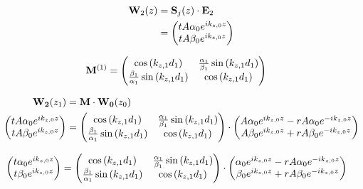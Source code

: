 \begin{align*}
	\vb{W}_2\pqty{z} &= \vb{S}_j\pqty{z} \cdot \vb{E}_2 \\
	&= \pmqty{
		tA \alpha_0 e^{i k_{z,0}z}  \\
		tA \beta_0 e^{i k_{z,0}z} }
\end{align*}

\begin{align*}
	\vb{M}^{(1)} 
		&= \pmqty{
		\cos\pqty{k_{z,1}d_1} &
		\frac{\alpha_1}{\beta_1} \sin\pqty{k_{z,1}d_1} \\
		\frac{\beta_1}{\alpha_1} \sin\pqty{k_{z,1}d_1} &
		\cos\pqty{k_{z,1}d_1}
		}
\end{align*}

\begin{align*}
	\vb{W_2}\pqty{z_1} &= \vb{M}\cdot\vb{W_0}\pqty{z_0} \\
	\pmqty{
		tA \alpha_0 e^{i k_{z,0}z}  \\
		tA \beta_0 e^{i k_{z,0}z} } &=
	\pmqty{
		\cos\pqty{k_{z,1}d_1} &
		\frac{\alpha_1}{\beta_1} \sin\pqty{k_{z,1}d_1} \\
		\frac{\beta_1}{\alpha_1} \sin\pqty{k_{z,1}d_1} &
		\cos\pqty{k_{z,1}d_1}
		} \cdot
	\pmqty{
		A \alpha_0 e^{i k_{z,0}z} - rA\alpha_0 e^{-i k_{z,0}z} \\
		A \beta_0 e^{i k_{z,0}z} + rA\beta_0 e^{-i k_{z,0}z}}
\end{align*}

\begin{align*}
	\pmqty{
		t \alpha_0 e^{i k_{z,0}z}  \\
		t \beta_0 e^{i k_{z,0}z} } &=
	\pmqty{
		\cos\pqty{k_{z,1}d_1} &
		\frac{\alpha_1}{\beta_1} \sin\pqty{k_{z,1}d_1} \\
		\frac{\beta_1}{\alpha_1} \sin\pqty{k_{z,1}d_1} &
		\cos\pqty{k_{z,1}d_1}
		} \cdot
	\pmqty{
		\alpha_0 e^{i k_{z,0}z} - rA\alpha_0 e^{-i k_{z,0}z} \\
		\beta_0 e^{i k_{z,0}z} + rA\beta_0 e^{-i k_{z,0}z}}
\end{align*}


\newpage











